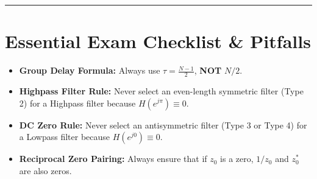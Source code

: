 \documentclass[11pt,a4paper]{article}
\begin{document}
\noindent\rule{\textwidth}{0.5pt}

\section{Essential Exam Checklist \& Pitfalls}
\begin{itemize}
    \item[$\square$] \textbf{Group Delay Formula:} Always use $\tau = \frac{N-1}{2}$, \textbf{NOT} $N/2$.
    \item[$\square$] \textbf{Highpass Filter Rule:} Never select an even-length symmetric filter (Type 2) for a Highpass filter because $H(e^{j\pi}) \equiv 0$.
    \item[$\square$] \textbf{DC Zero Rule:} Never select an antisymmetric filter (Type 3 or Type 4) for a Lowpass filter because $H(e^{j0}) \equiv 0$.
    \item[$\square$] \textbf{Reciprocal Zero Pairing:} Always ensure that if $z_0$ is a zero, $1/z_0$ and $z_0^*$ are also zeros.
\end{itemize}
\end{document}
